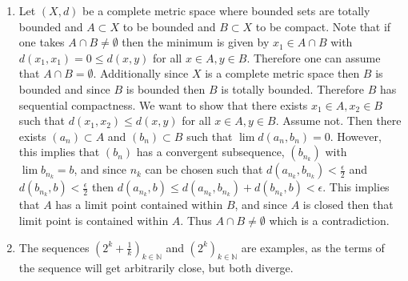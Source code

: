 \documentclass[12pt, letterpaper]{article}
\newcommand{\N}{\mathbb{N}}
\begin{document}
\begin{enumerate}
	\begin{enumerate}
		\item Let $(X,d)$ be a complete metric space where bounded sets are totally bounded and $A \subset X$ to be bounded and $B \subset X$ to be compact. 		Note that if one takes $A \cap B \neq \emptyset$ then the minimum is given 
		by $x_1 \in A \cap B$ with $d(x_1,x_1) = 0 \leq d(x,y)$ for all $x \in A, y \in B$.
		Therefore one can assume that $A \cap B = \emptyset$.  Additionally since $X$ is 
		a complete metric space then $B$ is bounded and since $B$ is bounded then 
		$B$ is totally bounded.  Therefore $B$ has sequential compactness.  We want to 
		show that there exists $x_1 \in A, x_2 \in B$ such that $d(x_1,x_2) \leq d(x,y)$
		for all $x \in A, y \in B$.  Assume not.  Then there exists $(a_n) \subset A$
		and $(b_n) \subset B$ such that $\lim d(a_n,b_n) = 0$.  However, this implies that 
		$(b_n)$ has a convergent subsequence, $(b_{n_k})$ with $\lim b_{n_k} = b$, and since $n_k$ can be chosen such that $d(a_{n_k}, b_{n_k}) < \frac{\epsilon}{2}$ and $d(b_{n_k}, b) < \frac{\epsilon}{2}$ then $d(a_{n_k}, b) \leq d(a_{n_k}, b_{n_k}) + d(b_{n_k}, b) < \epsilon$.  This implies that $A$ has a limit point contained within $B$, and since $A$ is 
		closed then that limit point is contained within $A$.  Thus $A \cap B \neq \emptyset$ which is a contradiction. 
		\item The sequences $(2^k + \frac{1}{k})_{k \in \N}$ and $(2^k)_{k \in \N}$ are 
		examples, as the terms of the sequence will get arbitrarily close, but both diverge.  
	\end{enumerate}
\end{enumerate}
\end{document}
